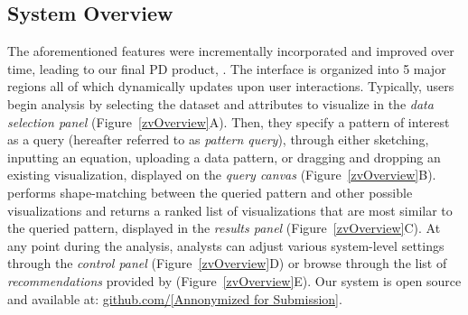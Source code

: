 \subsection{System Overview\label{sec:system}}%
The aforementioned features were incrementally incorporated and improved over time, leading to our final PD product, \zvpp. The \zvpp interface is organized into 5 major regions all of which dynamically updates upon user interactions. Typically, users begin analysis by selecting the dataset and attributes to visualize in the \emph{data selection panel} (Figure~\ref{zvOverview}A). Then, they specify a pattern of interest as a query (hereafter referred to as \emph{pattern query}), through either sketching, inputting an equation, uploading a data pattern, or dragging and dropping an existing visualization, displayed on the \emph{query canvas} (Figure~\ref{zvOverview}B). \zvpp performs shape-matching between the queried pattern and other possible visualizations and returns a ranked list of visualizations that are most similar to the queried pattern, displayed in the \emph{results panel} (Figure~\ref{zvOverview}C). At any point during the analysis, analysts can adjust various system-level settings through the \emph{control panel} (Figure~\ref{zvOverview}D) or browse through the list of \emph{recommendations} provided by \zvpp (Figure~\ref{zvOverview}E).  Our \zvpp system is open source and available at: \url{github.com/[Annonymized for Submission]}.
